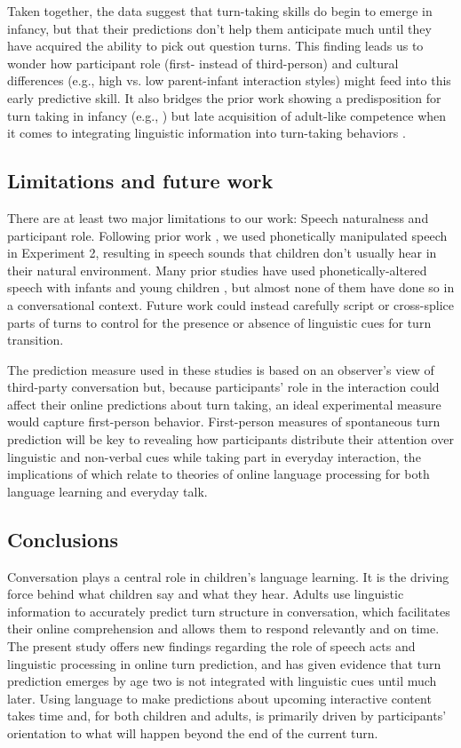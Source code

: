 \documentclass[authoryear, 12pt]{elsarticle}
\begin{document}
Taken together, the data suggest that turn-taking skills do begin to emerge in infancy, but that their predictions don't help them anticipate much until they have acquired the ability to pick out question turns. This finding leads us to wonder how participant role (first- instead of third-person) and cultural differences (e.g., high vs. low parent-infant interaction styles) might feed into this early predictive skill. It also bridges the prior work showing a predisposition for turn taking in infancy (e.g., \citealp{hilbrink2015}) but late acquisition of adult-like competence when it comes to integrating linguistic information into turn-taking behaviors \citep{casillas2016, garvey1984, ervin-tripp1979}.

\subsection{Limitations and future work}

There are at least two major limitations to our work: Speech naturalness and participant role. Following prior work \citep{de-ruiter2006, keitel2013}, we used phonetically manipulated speech in Experiment 2, resulting in speech sounds that children don't usually hear in their natural environment. Many prior studies have used phonetically-altered speech with infants and young children \citep[cf.][]{jusczyk2000}, but almost none of them have done so in a conversational context. Future work could instead carefully script or cross-splice parts of turns to control for the presence or absence of linguistic cues for turn transition.

The prediction measure used in these studies is based on an observer's view of third-party conversation but, because participants' role in the interaction could affect their online predictions about turn taking, an ideal experimental measure would capture first-person behavior. First-person measures of spontaneous turn prediction will be key to revealing how participants distribute their attention over linguistic and non-verbal cues while taking part in everyday interaction, the implications of which relate to theories of online language processing for both language learning and everyday talk.

\subsection{Conclusions}

Conversation plays a central role in children's language learning. It is the driving force behind what children say and what they hear. Adults use linguistic information to accurately predict turn structure in conversation, which facilitates their online comprehension and allows them to respond relevantly and on time. The present study offers new findings regarding the role of speech acts and linguistic processing in online turn prediction, and has given evidence that turn prediction emerges by age two is not integrated with linguistic cues until much later. Using language to make predictions about upcoming interactive content takes time and, for both children and adults, is primarily driven by participants' orientation to what will happen beyond the end of the current turn.
\end{document}
